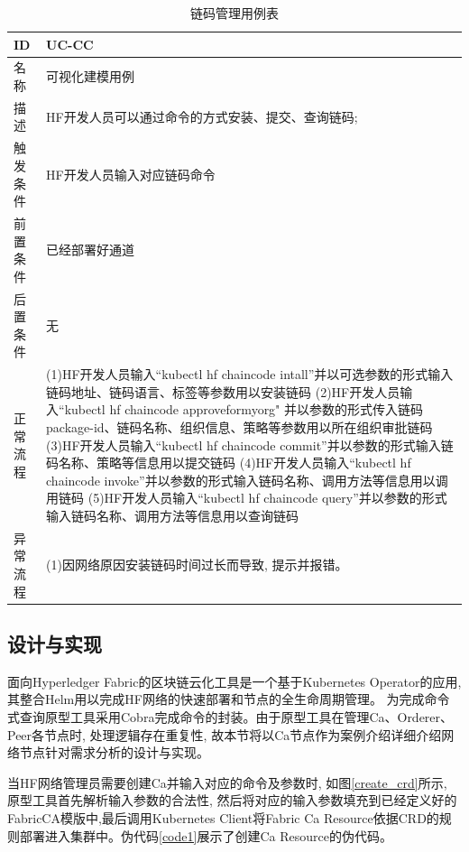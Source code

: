 {\footnotesize
\begin{longtable}[h]{m{60pt}|m{280pt}}
    \caption[链码管理用例表]{链码管理用例表} \label{cc_use_case} \\
        \hline  
        ID&UC-CC\\
        \hline
        名称&可视化建模用例\\
        \hline
        描述&HF开发人员可以通过命令的方式安装、提交、查询链码;\\
        \hline
        触发条件&HF开发人员输入对应链码命令\\
        \hline
        前置条件&已经部署好通道\\
        \hline
        后置条件&无\\
        \hline
        正常流程& (1)HF开发人员输入“kubectl hf chaincode intall”并以可选参数的形式输入链码地址、链码语言、标签等参数用以安装链码
        \newline (2)HF开发人员输入“kubectl hf chaincode approveformyorg" 并以参数的形式传入链码package-id、链码名称、组织信息、策略等参数用以所在组织审批链码
        \newline (3)HF开发人员输入“kubectl hf chaincode commit”并以参数的形式输入链码名称、策略等信息用以提交链码
        \newline (4)HF开发人员输入“kubectl hf chaincode invoke”并以参数的形式输入链码名称、调用方法等信息用以调用链码
        \newline (5)HF开发人员输入“kubectl hf chaincode query”并以参数的形式输入链码名称、调用方法等信息用以查询链码\\
        \hline 
        异常流程& (1)因网络原因安装链码时间过长而导致, 提示并报错。\\
        \hline
    \end{longtable} 
}

\subsection{设计与实现}

面向Hyperledger Fabric的区块链云化工具是一个基于Kubernetes Operator的应用, 其整合Helm用以完成HF网络的快速部署和节点的全生命周期管理。 为完成命令式查询原型工具采用Cobra\footnotemark[1]完成命令的封装。由于原型工具在管理Ca、Orderer、Peer各节点时, 处理逻辑存在重复性, 故本节将以Ca节点作为案例介绍详细介绍网络节点针对需求分析的设计与实现。

当HF网络管理员需要创建Ca并输入对应的命令及参数时, 如图\ref{create_crd}所示, 原型工具首先解析输入参数的合法性, 然后将对应的输入参数填充到已经定义好的FabricCA模版中,最后调用Kubernetes Client将Fabric Ca Resource依据CRD的规则部署进入集群中。伪代码\ref{code1}展示了创建Ca Resource的伪代码。

